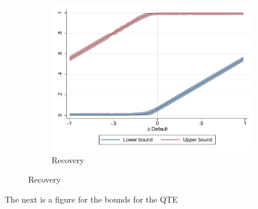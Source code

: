 \documentclass[oneside,11pt]{article}
\begin{document}
\begin{figure}[H]
\begin{center}
\begin{subfigure}{0.475\textwidth}
        \caption{Recovery}
        \centering
        \includegraphics[width=\textwidth]{Figuras/fan_park_bounds_des_c.pdf}
    \end{subfigure}    
    \end{center}
\end{figure}


The next is a figure for the bounds for the QTE
\end{document}
